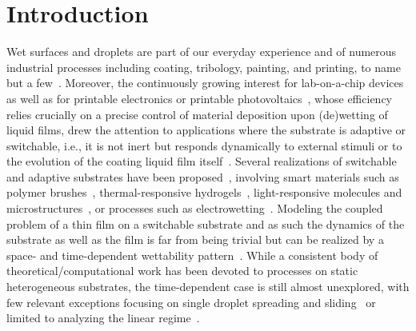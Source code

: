 \section{Introduction} 
Wet surfaces and droplets are part of our everyday experience and of numerous industrial processes including coating, tribology, painting, and printing, to name but a few~\cite{grossFluidFilmLubrication1980,szeriFluidFilmLubrication2010,quereFluidCoatingFiber1999,dasilvasobrinhoStudyDefectsUltrathin1999,singhInkjetPrintingProcess2010,wijshoffDynamicsPiezoInkjet2010}. 
Moreover, the continuously growing interest for lab-on-a-chip devices~\cite{samieiReviewDigitalMicrofluidics2016,fockeLabonaFoilMicrofluidicsThin2010} as well as for printable electronics or printable photovoltaics~\cite{brabecPlasticSolarCells2001,ronsinRoleInterplaySpinodal2020}, whose efficiency relies crucially on a precise control of material deposition upon (de)wetting of liquid films, drew the attention to applications where the substrate is adaptive or switchable, i.e., it is not inert but responds dynamically to external stimuli or to the evolution of the coating liquid film itself~\cite{buttAdaptiveWettingAdaptation2018}. 
Several realizations of switchable and adaptive substrates have been proposed~\cite{xinReversiblySwitchableWettability2010}, involving smart materials such as polymer brushes~\cite{stuartEmergingApplicationsStimuliresponsive2010}, thermal-responsive hydrogels~\cite{chenThermalresponsiveHydrogelSurface2010}, light-responsive molecules and microstructures~\cite{ichimuraLightDrivenMotionLiquids2000}, or processes such as electrowetting~\cite{mugeleElectrowettingConvenientWay2005}. 
Modeling the coupled problem of a thin film on a switchable substrate and as such the dynamics of the substrate as well as the film is far from being trivial but can be realized by a space- and time-dependent wettability pattern~\cite{grawitterSteeringDropletsSubstrates2021}.
While a consistent body of theoretical/computational work has been devoted to processes on static heterogeneous substrates, the time-dependent case is still almost unexplored, with few relevant exceptions focusing on single droplet spreading and sliding~\cite{grawitterSteeringDropletsSubstrates2021,grawitterDropletsSubstratesOscillating2021,thieleGradientDynamicsModel2020} or limited to analyzing the linear regime~\cite{sumanDynamicsThinLiquid2006}.

